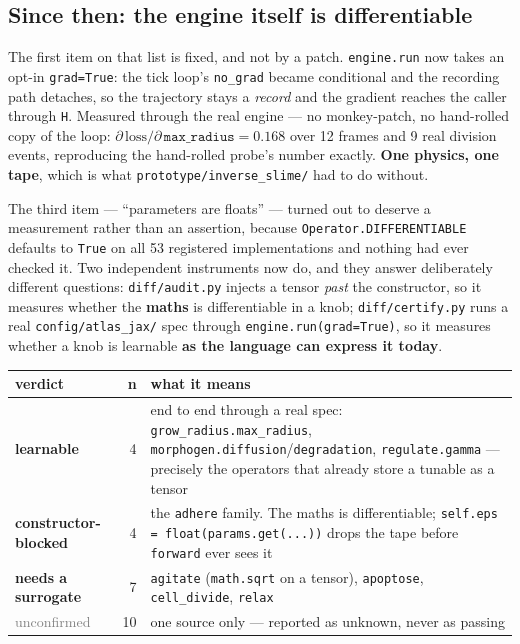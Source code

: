 \documentclass[11pt,a4paper]{article}
\newcommand{\code}[1]{\texttt{#1}}
\begin{document}
\subsection{Since then: the engine itself is differentiable}\label{sec:p6now}

The first item on that list is fixed, and not by a patch. \code{engine.run} now takes an opt-in
\code{grad=True}: the tick loop's \code{no\_grad} became conditional and the recording path
detaches, so the trajectory stays a \emph{record} and the gradient reaches the caller through
\code{H}. Measured through the real engine --- no monkey-patch, no hand-rolled copy of the loop:
$\partial\,\mathrm{loss}/\partial\,\code{max\_radius} = 0.168$ over 12 frames and 9 real division
events, reproducing the hand-rolled probe's number exactly. \textbf{One physics, one tape}, which
is what \code{prototype/inverse\_slime/} had to do without.

The third item --- ``parameters are floats'' --- turned out to deserve a measurement rather than an
assertion, because \code{Operator.DIFFERENTIABLE} defaults to \code{True} on all 53 registered
implementations and nothing had ever checked it. Two independent instruments now do, and they
answer deliberately different questions: \code{diff/audit.py} injects a tensor \emph{past} the
constructor, so it measures whether the \textbf{maths} is differentiable in a knob;
\code{diff/certify.py} runs a real \code{config/atlas_jax/} spec through \code{engine.run(grad=True)},
so it measures whether a knob is learnable \textbf{as the language can express it today}.

\begin{center}
\small
\begin{tabular}{@{}l r p{9.1cm}@{}}
\toprule
\textbf{verdict} & \textbf{n} & \textbf{what it means}\\
\midrule
\textcolor{good}{\textbf{learnable}} & 4 &
end to end through a real spec: \code{grow\_radius.max\_radius},
\code{morphogen.diffusion}/\code{degradation}, \code{regulate.gamma} --- precisely the operators
that already store a tunable as a tensor\\
\textcolor{warn}{\textbf{constructor-blocked}} & 4 &
the \code{adhere} family. The maths is differentiable; \code{self.eps = float(params.get(...))}
drops the tape before \code{forward} ever sees it\\
\textcolor{bad}{\textbf{needs a surrogate}} & 7 &
\code{agitate} (\code{math.sqrt} on a tensor), \code{apoptose}, \code{cell\_divide},
\code{relax}\\
\textcolor{grey}{unconfirmed} & 10 &
one source only --- reported as unknown, never as passing\\
\bottomrule
\end{tabular}
\end{center}
\end{document}
